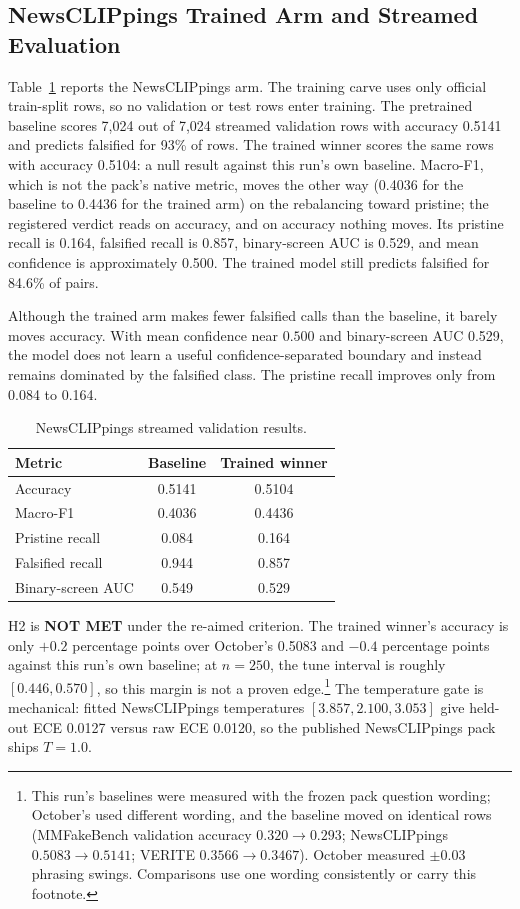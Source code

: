 \documentclass{article} %
\begin{document}
\subsection{NewsCLIPpings Trained Arm and Streamed Evaluation}
Table~\ref{tab:ncp} reports the NewsCLIPpings arm. The training carve uses only official train-split rows, so no validation or test rows enter training. The pretrained baseline scores 7,024 out of 7,024 streamed validation rows with accuracy 0.5141 and predicts falsified for 93\% of rows. The trained winner scores the same rows with accuracy 0.5104: a null result against this run's own baseline. Macro-F1, which is not the pack's native metric, moves the other way (0.4036 for the baseline to 0.4436 for the trained arm) on the rebalancing toward pristine; the registered verdict reads on accuracy, and on accuracy nothing moves. Its pristine recall is 0.164, falsified recall is 0.857, binary-screen AUC is 0.529, and mean confidence is approximately 0.500. The trained model still predicts falsified for 84.6\% of pairs.

Although the trained arm makes fewer falsified calls than the baseline, it barely moves accuracy. With mean confidence near \(0.500\) and binary-screen AUC 0.529, the model does not learn a useful confidence-separated boundary and instead remains dominated by the falsified class. The pristine recall improves only from 0.084 to 0.164.

\begin{table}[t]
\centering
\small
\caption{NewsCLIPpings streamed validation results.}
\label{tab:ncp}
\begin{tabular}{lcc}
\toprule
Metric & Baseline & Trained winner \\
\midrule
Accuracy & 0.5141 & 0.5104 \\
Macro-F1 & 0.4036 & 0.4436 \\
Pristine recall & 0.084 & 0.164 \\
Falsified recall & 0.944 & 0.857 \\
Binary-screen AUC & 0.549 & 0.529 \\
\bottomrule
\end{tabular}
\end{table}

H2 is \textbf{NOT MET} under the re-aimed criterion. The trained winner's accuracy is only \(+0.2\) percentage points over October's 0.5083 and \(-0.4\) percentage points against this run's own baseline; at \(n=250\), the tune interval is roughly \([0.446, 0.570]\), so this margin is not a proven edge.\footnote{This run's baselines were measured with the frozen pack question wording; October's used different wording, and the baseline moved on identical rows (MMFakeBench validation accuracy \(0.320\rightarrow0.293\); NewsCLIPpings \(0.5083\rightarrow0.5141\); VERITE \(0.3566\rightarrow0.3467\)). October measured \(\pm0.03\) phrasing swings. Comparisons use one wording consistently or carry this footnote.} The temperature gate is mechanical: fitted NewsCLIPpings temperatures \([3.857, 2.100, 3.053]\) give held-out ECE 0.0127 versus raw ECE 0.0120, so the published NewsCLIPpings pack ships \(T=1.0\).
\end{document}
